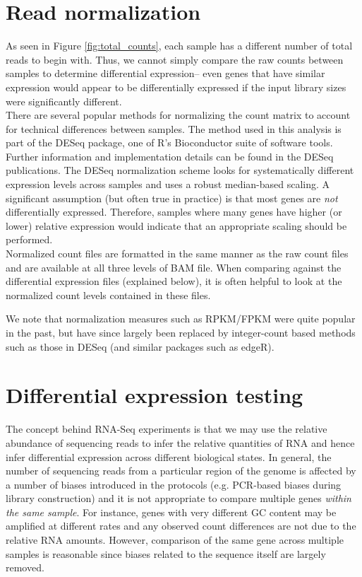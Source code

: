 \documentclass{article}
\begin{document}
\section{Read normalization}
\label{sec:normalization}

As seen in Figure \ref{fig:total_counts}, each sample has a different number of total reads to begin with.  Thus, we cannot simply compare the raw counts between samples to determine differential expression-- even genes that have similar expression would appear to be differentially expressed if the input library sizes were significantly different.\\

There are several popular methods for normalizing the count matrix to account for technical differences between samples.  The method used in this analysis is part of the DESeq \cite{deseq} package, one of R's Bioconductor suite of software tools.  Further information and implementation details can be found in the DESeq publications.  The DESeq normalization scheme looks for systematically different expression levels across samples and uses a robust median-based scaling.  A significant assumption (but often true in practice) is that most genes are \emph{not} differentially expressed.  Therefore, samples where many genes have higher (or lower) relative expression would indicate that an appropriate scaling should be performed.   \\

Normalized count files are formatted in the same manner as the raw count files and are available at all three levels of BAM file.  When comparing against the differential expression files (explained below), it is often helpful to look at the normalized count levels contained in these files.

We note that normalization measures such as RPKM/FPKM were quite popular in the past, but have since largely been replaced by integer-count based methods such as those in DESeq (and similar packages such as edgeR).

\section{Differential expression testing}

The concept behind RNA-Seq experiments is that we may use the relative abundance of sequencing reads to infer the relative quantities of RNA and hence infer differential expression across different biological states.  In general, the number of sequencing reads from a particular region of the genome is affected by a number of biases introduced in the protocols (e.g. PCR-based biases during library construction) and it is not appropriate to compare multiple genes \emph{within the same sample}.  For instance, genes with very different GC content may be amplified at different rates and any observed count differences are not due to the relative RNA amounts.  However, comparison of the same gene across multiple samples is reasonable since biases related to the sequence itself are largely removed.\\
\end{document}
